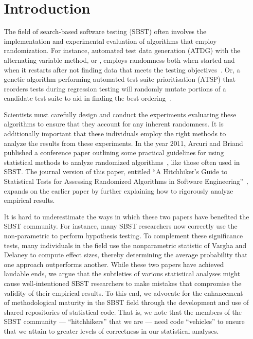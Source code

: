 
\section{Introduction}
\label{sec:introduction}

The field of search-based software testing (SBST) often involves the implementation and experimental evaluation of
algorithms that employ randomization. For instance, automated test data generation (ATDG) with the alternating variable
method, or \AVM, employs randomness both when started and when it restarts after not finding data that meets the testing
objectives~\cite{McMinn2015}. Or, a genetic algorithm performing automated test suite prioritisation (ATSP) that
reorders tests during regression testing will randomly mutate portions of a candidate test suite to aid in finding the
best ordering~\cite{Walcott2006}.

Scientists must carefully design and conduct the experiments evaluating these algorithms to ensure that they account for
any inherent randomness. It is additionally important that these individuals employ the right methods to analyze the
results from these experiments. In the year 2011, Arcuri and Briand published a conference paper outlining some
practical guidelines for using statistical methods to analyze randomized algorithms~\cite{Arcuri2011}, like those often
used in SBST. The journal version of this paper, entitled ``A Hitchhiker's Guide to Statistical Tests for Assessing
Randomized Algorithms in Software Engineering''~\cite{Arcuri2014}, expands on the earlier paper by further explaining
how to rigorously analyze empirical results.

It is hard to underestimate the ways in which these two papers have benefited the SBST community. For instance, many
SBST researchers now correctly use the non-parametric \wilcoxon to perform hypothesis testing. To complement these
significance tests, many individuals in the field use the nonparametric \atwelve statistic of Vargha and Delaney
\cite{Vargha2000} to compute effect sizes, thereby determining the average probability that one approach outperforms
another. While these two papers have achieved laudable ends, we argue that the subtleties of various statistical
analyses might cause well-intentioned SBST researchers to make mistakes that compromise the validity of their empirical
results. To this end, we advocate for the enhancement of methodological maturity in the SBST field through the development
and use of shared repositories of statistical code. That is, we note that the members of the SBST community ---
``hitchhikers'' that we are --- need code ``vehicles'' to ensure that we attain to greater levels of correctness in our
statistical analyses.


